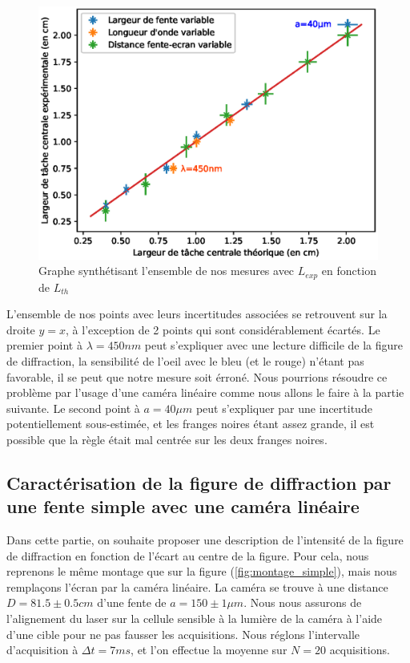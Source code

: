 \documentclass[12pt]{article}
\begin{document}
\begin{figure}[!h]
    \begin{center}
        \includegraphics[scale=0.65]{img/graph_final_diffrac_simple.eps}
    \end{center}
    \caption{Graphe synthétisant l'ensemble de nos mesures avec $L_{exp}$ en fonction de $L_{th}$}
\end{figure}

L'ensemble de nos points avec leurs incertitudes associées se retrouvent sur la droite $y = x$, à l'exception de 2 points qui sont considérablement écartés.
Le premier point à $\lambda = 450nm$ peut s'expliquer avec une lecture difficile de la figure de diffraction, la sensibilité de l'oeil avec le bleu (et le rouge) n'étant pas favorable, il se peut que notre mesure soit érroné. Nous pourrions
résoudre ce problème par l'usage d'une caméra linéaire comme nous allons le faire à la partie suivante.
Le second point à $a=40 \mu m$ peut s'expliquer par une incertitude potentiellement sous-estimée, et les franges noires étant assez grande, il est possible que la règle était mal centrée sur les deux franges noires.

\subsection{Caractérisation de la figure de diffraction par une fente simple avec une caméra linéaire}
Dans cette partie, on souhaite proposer une description de l'intensité de la figure de diffraction en fonction de l'écart au centre de la figure. Pour cela, nous reprenons le même montage
que sur la figure (\ref{fig:montage_simple}), mais nous remplaçons l'écran par la caméra linéaire. La caméra se trouve à une distance $D = 81.5 \pm 0.5cm$ d'une fente de $a = 150 \pm 1 \mu m$.
Nous nous assurons de l'alignement du laser sur la cellule sensible à la lumière de la caméra à l'aide d'une cible pour ne pas fausser
les acquisitions. Nous réglons l'intervalle d'acquisition à $\Delta t = 7 ms$, et l'on effectue la moyenne sur $N = 20$ acquisitions. 
\end{document}
